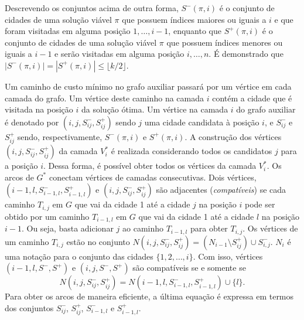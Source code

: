 \documentclass{article}
\begin{document}
Descrevendo os conjuntos acima de outra forma, $S^-(\pi, i)$ é o conjunto de cidades de uma solução viável $\pi$ que possuem índices maiores ou iguais a $i$ e que foram visitadas em alguma posição $1, \dots, i-1$, enquanto que $S^+(\pi,i)$ é o conjunto de cidades de uma solução viável $\pi$ que possuem índices menores ou iguais a $i-1$ e serão visitadas em alguma posição $i, \dots, n$. É demonstrado que $|S^-(\pi, i)| = |S^+(\pi, i)| \leq \lfloor k/2 \rfloor$.

Um caminho de custo mínimo no grafo auxiliar passará por um vértice em cada camada do grafo. Um vértice deste caminho na camada $i$ contém a cidade que é visitada na posição $i$ da solução ótima. Um vértice na camada $i$ do grafo auxiliar é denotado por $(i, j, S^-_{ij}, S^+_{ij})$ sendo $j$ uma cidade candidata à posição $i$, e $S^-_{ij}$ e $S^+_{ij}$ sendo, respectivamente, $S^-(\pi, i)$ e $S^+(\pi, i)$. A construção dos vértices  $(i, j, S^-_{ij}, S^+_{ij})$ da camada $V^*_i$ é realizada considerando todos os candidatos $j$ para a posição $i$. Dessa forma, é possível obter todos os vértices da camada $V^*_i$. Os arcos de $G^*$ conectam vértices de camadas consecutivas. Dois vértices, $(i-1, l, S^-_{i-1, l}, S^+_{i-1, l})$ e $(i, j, S^-_{ij}, S^+_{ij})$ são adjacentes (\emph{compatíveis}) se cada caminho $T_{i,j}$ em $G$ que vai da cidade 1 até a cidade $j$ na posição $i$ pode ser obtido por um caminho $T_{i-1,l}$ em $G$ que vai da cidade 1 até a cidade $l$ na posição $i-1$. Ou seja, basta adicionar $j$ ao caminho $T_{i-1,l}$ para obter $T_{i,j}$. Os vértices de um caminho $T_{i,j}$ estão no conjunto $N(i,j,S^-_{ij}, S^+_{ij}) = (N_{i-1} \setminus S^+_{ij}) \cup S^-_{i,j}$. $N_i$ é uma notação para o conjunto das cidades $\{1, 2, \dots, i\}$. Com isso, vértices $(i-1, l, S^-, S^+)$ e $(i, j, S^-, S^+)$ são compatíveis se e somente se $$N(i, j, S^-_{ij}, S^+_{ij}) = N(i-1, l, S^-_{i-1,l}, S^+_{i-1,l}) \cup \{l\}.$$ Para obter os arcos de maneira eficiente, a última equação é expressa em termos dos conjuntos $S^-_{ij}$, $S^+_{ij}$, $S^-_{i-1, l}$ e $S^+_{i-1, l}$.
\end{document}
